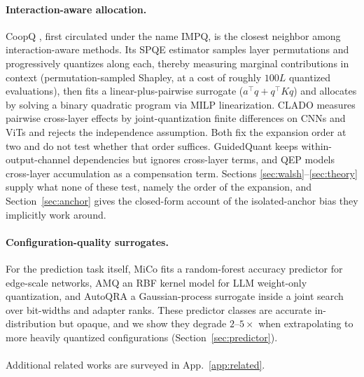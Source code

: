 \paragraph{Interaction-aware allocation.} CoopQ \citep{impq2025}, first circulated under the name IMPQ,
is the closest neighbor among interaction-aware methods. Its SPQE estimator samples layer permutations and progressively
quantizes along each, thereby measuring marginal contributions in context (permutation-sampled Shapley, at
a cost of roughly $100L$ quantized evaluations), then fits a linear-plus-pairwise surrogate
($a^\top q + q^\top K q$) and allocates by solving a binary quadratic program via MILP linearization.
CLADO \citep{clado2023} measures pairwise cross-layer effects by joint-quantization finite differences on
CNNs and ViTs and rejects the independence assumption.
Both fix the expansion order at two and do not test whether that order suffices. GuidedQuant
\citep{kim2025guidedquant} keeps within-output-channel dependencies but ignores cross-layer terms, and QEP
\citep{qep2025} models cross-layer accumulation as a compensation term. Sections
\ref{sec:walsh}--\ref{sec:theory} supply what none of these test, namely the order of the expansion, and
Section~\ref{sec:anchor} gives the closed-form account of the isolated-anchor bias they implicitly work around.

\paragraph{Configuration-quality surrogates.} For the prediction task itself, MiCo \citep{mico2025} fits
a random-forest accuracy predictor for edge-scale networks, AMQ \citep{amq2025} an RBF kernel model for
LLM weight-only quantization, and AutoQRA \citep{autoqra2026} a Gaussian-process surrogate inside a joint
search over bit-widths and adapter ranks. These predictor classes are accurate in-distribution but opaque,
and we show they degrade $2$--$5\times$ when extrapolating to more heavily quantized configurations
(Section~\ref{sec:predictor}).



\paragraph{}Additional related works are surveyed in App.~\ref{app:related}.

